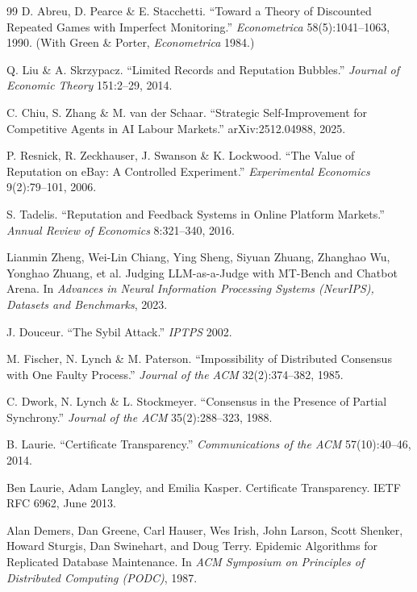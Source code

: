 \documentclass[11pt,a4paper]{article}
\theoremstyle{definition}
\theoremstyle{definition}
\theoremstyle{remark}
\begin{document}
\begin{thebibliography}{99}
 D. Abreu, D. Pearce \& E. Stacchetti. ``Toward a Theory of
Discounted Repeated Games with Imperfect Monitoring.'' \emph{Econometrica}
58(5):1041--1063, 1990. (With Green \& Porter, \emph{Econometrica} 1984.)

 Q. Liu \& A. Skrzypacz. ``Limited Records and Reputation
Bubbles.'' \emph{Journal of Economic Theory} 151:2--29, 2014.

 C. Chiu, S. Zhang \& M. van der Schaar. ``Strategic
Self-Improvement for Competitive Agents in AI Labour Markets.'' arXiv:2512.04988,
2025.

 P. Resnick, R. Zeckhauser, J. Swanson \& K. Lockwood. ``The
Value of Reputation on eBay: A Controlled Experiment.'' \emph{Experimental
Economics} 9(2):79--101, 2006.

 S. Tadelis. ``Reputation and Feedback Systems in Online
Platform Markets.'' \emph{Annual Review of Economics} 8:321--340, 2016.

Lianmin Zheng, Wei-Lin Chiang, Ying Sheng, Siyuan Zhuang, Zhanghao Wu, Yonghao Zhuang, et al.
\newblock Judging LLM-as-a-Judge with MT-Bench and Chatbot Arena.
\newblock In \textit{Advances in Neural Information Processing Systems (NeurIPS), Datasets and Benchmarks}, 2023.

 J. Douceur. ``The Sybil Attack.'' \emph{IPTPS} 2002.

 M. Fischer, N. Lynch \& M. Paterson. ``Impossibility of
Distributed Consensus with One Faulty Process.'' \emph{Journal of the ACM}
32(2):374--382, 1985.

 C. Dwork, N. Lynch \& L. Stockmeyer. ``Consensus in the Presence
of Partial Synchrony.'' \emph{Journal of the ACM} 35(2):288--323, 1988.

 B. Laurie. ``Certificate Transparency.'' \emph{Communications
of the ACM} 57(10):40--46, 2014.

Ben Laurie, Adam Langley, and Emilia Kasper.
\newblock Certificate Transparency.
\newblock IETF RFC 6962, June 2013.

Alan Demers, Dan Greene, Carl Hauser, Wes Irish, John Larson, Scott Shenker, Howard Sturgis, Dan Swinehart, and Doug Terry.
\newblock Epidemic Algorithms for Replicated Database Maintenance.
\newblock In \textit{ACM Symposium on Principles of Distributed Computing (PODC)}, 1987.


\end{thebibliography}
\end{document}
